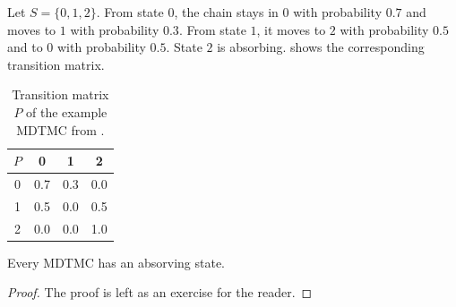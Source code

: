 \begin{example}
\label{ex01}
Let $S=\{0,1,2\}$.
From state $0$, the chain stays in $0$ with probability $0.7$ and moves to $1$ with probability $0.3$.
From state $1$, it moves to $2$ with probability $0.5$ and to $0$ with probability $0.5$.
State $2$ is absorbing.
 shows the corresponding transition matrix.
\end{example}

\begin{table}[H]
\centering
\caption{Transition matrix $P$ of the example MDTMC from .}
\begin{tabular}{c|ccc}
$P$ & 0 & 1 & 2\\ \hline
0 & 0.7 & 0.3 & 0.0\\
1 & 0.5 & 0.0 & 0.5\\
2 & 0.0 & 0.0 & 1.0\\
\end{tabular}
\label{tab01}
\end{table}

\begin{theorem}
    \label{keythm}
    Every MDTMC has an absorving state.
\end{theorem}

\begin{proof}
    The proof is left as an exercise for the reader.
\end{proof}